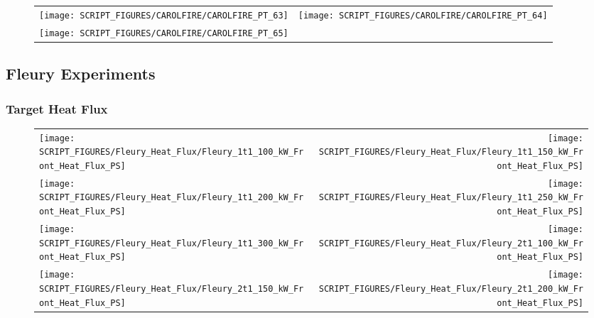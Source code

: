 \begin{figure}[!ht]
\begin{tabular*}{\textwidth}{l@{\extracolsep{\fill}}r}
\texttt{[image: SCRIPT\_FIGURES/CAROLFIRE/CAROLFIRE\_PT\_63]} &
\texttt{[image: SCRIPT\_FIGURES/CAROLFIRE/CAROLFIRE\_PT\_64]} \\
\texttt{[image: SCRIPT\_FIGURES/CAROLFIRE/CAROLFIRE\_PT\_65]}
\end{tabular*}
\end{figure}

\clearpage

\subsection{Fleury Experiments}

\subsubsection{Target Heat Flux}

\begin{figure}[!ht]
\begin{tabular*}{\textwidth}{l@{\extracolsep{\fill}}r}
\texttt{[image: SCRIPT\_FIGURES/Fleury\_Heat\_Flux/Fleury\_1t1\_100\_kW\_Front\_Heat\_Flux\_PS]} &
\texttt{[image: SCRIPT\_FIGURES/Fleury\_Heat\_Flux/Fleury\_1t1\_150\_kW\_Front\_Heat\_Flux\_PS]} \\
\texttt{[image: SCRIPT\_FIGURES/Fleury\_Heat\_Flux/Fleury\_1t1\_200\_kW\_Front\_Heat\_Flux\_PS]} &
\texttt{[image: SCRIPT\_FIGURES/Fleury\_Heat\_Flux/Fleury\_1t1\_250\_kW\_Front\_Heat\_Flux\_PS]} \\
\texttt{[image: SCRIPT\_FIGURES/Fleury\_Heat\_Flux/Fleury\_1t1\_300\_kW\_Front\_Heat\_Flux\_PS]} &
\texttt{[image: SCRIPT\_FIGURES/Fleury\_Heat\_Flux/Fleury\_2t1\_100\_kW\_Front\_Heat\_Flux\_PS]} \\
\texttt{[image: SCRIPT\_FIGURES/Fleury\_Heat\_Flux/Fleury\_2t1\_150\_kW\_Front\_Heat\_Flux\_PS]} &
\texttt{[image: SCRIPT\_FIGURES/Fleury\_Heat\_Flux/Fleury\_2t1\_200\_kW\_Front\_Heat\_Flux\_PS]}
\end{tabular*}
\end{figure}

